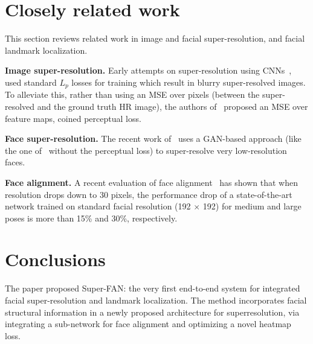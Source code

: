 \documentclass[10pt,twocolumn,letterpaper]{article}
\begin{document}
\section{Closely related work} 
This section reviews related work in image and facial super-resolution, and facial landmark localization.\par
\textbf{Image super-resolution.} Early attempts on super-resolution using CNNs~\cite{Dong2016Image},\cite{Jiwon_2015_Accurate} used standard $L_p$ losses for training which result in blurry super-resolved images. To alleviate this, rather than using an MSE over pixels (between the super-resolved and the ground truth HR image), the authors of~\cite{Justin_2016_Perceptual} proposed an MSE over feature maps, coined perceptual loss.\par
\textbf{Face super-resolution.} The recent work of~\cite{Yu_2016_Ultra} uses a GAN-based approach (like the one of~\cite{Christian_2016_Photo} without the perceptual loss) to super-resolve very low-resolution faces.\par
\textbf{Face alignment.} A recent evaluation of face alignment~\cite{Bulat2017How} has shown that when resolution drops down to 30 pixels, the performance drop of a state-of-the-art network trained on standard facial resolution (192 $\times$ 192) for medium and large poses is more than 15\% and 30\%, respectively.\par

\section{Conclusions}
The paper proposed Super-FAN: the very first end-to-end system for integrated facial super-resolution and landmark localization. The method incorporates facial structural information in a newly proposed architecture for superresolution, via integrating a sub-network for face alignment and optimizing a novel heatmap loss.
\end{document}
